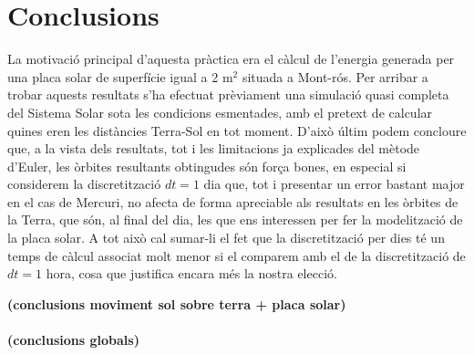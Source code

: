 \documentclass[10pt, twoside, a4paper]{article}
\begin{document}
\section{Conclusions}

La motivació principal d'aquesta pràctica era el càlcul de l'energia generada per una placa solar de superfície igual a 2 m$^2$ situada a Mont-rós. Per arribar a trobar aquests resultats s'ha efectuat prèviament una simulació quasi completa del Sistema Solar sota les condicions esmentades, amb el pretext de calcular quines eren les distàncies Terra-Sol en tot moment. D'això últim podem concloure que, a la vista dels resultats, tot i les limitacions ja explicades del mètode d'Euler, les òrbites resultants obtingudes són força bones, en especial si considerem la discretització $dt=1$ dia que, tot i presentar un error bastant major en el cas de Mercuri, no afecta de forma apreciable als resultats en les òrbites de la Terra, que són, al final del dia, les que ens interessen per fer la modelització de la placa solar. A tot això cal sumar-li el fet que la discretització per dies té un temps de càlcul associat molt menor si el comparem amb el de la discretització de $dt=1$ hora, cosa que justifica encara més la nostra elecció. 

\textbf{(conclusions moviment sol sobre terra + placa solar)}
\\
\\
\textbf{(conclusions globals)}
\end{document}
